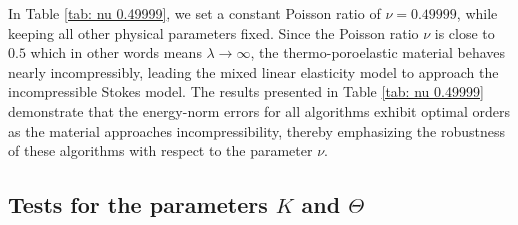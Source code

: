\documentclass{article}
\numberwithin{equation}{section}
\begin{document}
In Table \ref{tab: nu 0.49999}, we set a constant Poisson ratio of \(\nu = 0.49999\), while keeping all other physical parameters fixed. Since the Poisson ratio \(\nu\) is close to \(0.5\) which in other words means \( \lambda\to\infty\), the thermo-poroelastic material behaves nearly incompressibly, leading the mixed linear elasticity model to approach the incompressible Stokes model. The results presented in Table \ref{tab: nu 0.49999} demonstrate that the energy-norm errors for all algorithms exhibit optimal orders as the material approaches incompressibility, thereby emphasizing the robustness of these algorithms with respect to the parameter \(\nu\).
 

\subsection{Tests for the parameters $ K$ and $\Theta$}
\end{document}
